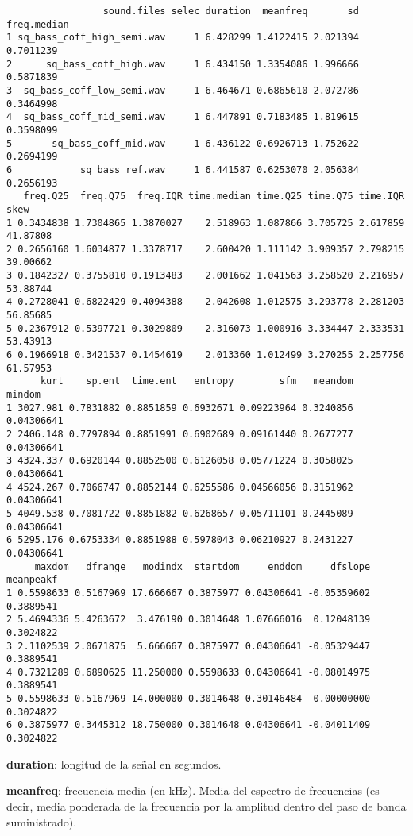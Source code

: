 \documentclass[
]{article}
\begin{document}
\begin{verbatim}
                 sound.files selec duration  meanfreq       sd freq.median
1 sq_bass_coff_high_semi.wav     1 6.428299 1.4122415 2.021394   0.7011239
2      sq_bass_coff_high.wav     1 6.434150 1.3354086 1.996666   0.5871839
3  sq_bass_coff_low_semi.wav     1 6.464671 0.6865610 2.072786   0.3464998
4  sq_bass_coff_mid_semi.wav     1 6.447891 0.7183485 1.819615   0.3598099
5       sq_bass_coff_mid.wav     1 6.436122 0.6926713 1.752622   0.2694199
6            sq_bass_ref.wav     1 6.441587 0.6253070 2.056384   0.2656193
   freq.Q25  freq.Q75  freq.IQR time.median time.Q25 time.Q75 time.IQR     skew
1 0.3434838 1.7304865 1.3870027    2.518963 1.087866 3.705725 2.617859 41.87808
2 0.2656160 1.6034877 1.3378717    2.600420 1.111142 3.909357 2.798215 39.00662
3 0.1842327 0.3755810 0.1913483    2.001662 1.041563 3.258520 2.216957 53.88744
4 0.2728041 0.6822429 0.4094388    2.042608 1.012575 3.293778 2.281203 56.85685
5 0.2367912 0.5397721 0.3029809    2.316073 1.000916 3.334447 2.333531 53.43913
6 0.1966918 0.3421537 0.1454619    2.013360 1.012499 3.270255 2.257756 61.57953
      kurt    sp.ent  time.ent   entropy        sfm   meandom     mindom
1 3027.981 0.7831882 0.8851859 0.6932671 0.09223964 0.3240856 0.04306641
2 2406.148 0.7797894 0.8851991 0.6902689 0.09161440 0.2677277 0.04306641
3 4324.337 0.6920144 0.8852500 0.6126058 0.05771224 0.3058025 0.04306641
4 4524.267 0.7066747 0.8852144 0.6255586 0.04566056 0.3151962 0.04306641
5 4049.538 0.7081722 0.8851882 0.6268657 0.05711101 0.2445089 0.04306641
6 5295.176 0.6753334 0.8851988 0.5978043 0.06210927 0.2431227 0.04306641
     maxdom   dfrange   modindx  startdom     enddom     dfslope meanpeakf
1 0.5598633 0.5167969 17.666667 0.3875977 0.04306641 -0.05359602 0.3889541
2 5.4694336 5.4263672  3.476190 0.3014648 1.07666016  0.12048139 0.3024822
3 2.1102539 2.0671875  5.666667 0.3875977 0.04306641 -0.05329447 0.3889541
4 0.7321289 0.6890625 11.250000 0.5598633 0.04306641 -0.08014975 0.3889541
5 0.5598633 0.5167969 14.000000 0.3014648 0.30146484  0.00000000 0.3024822
6 0.3875977 0.3445312 18.750000 0.3014648 0.04306641 -0.04011409 0.3024822
\end{verbatim}

\textbf{duration}: longitud de la señal en segundos.

\vspace{6pt}

\textbf{meanfreq}: frecuencia media (en kHz). Media del espectro de
frecuencias (es decir, media ponderada de la frecuencia por la amplitud
dentro del paso de banda suministrado).
\end{document}
